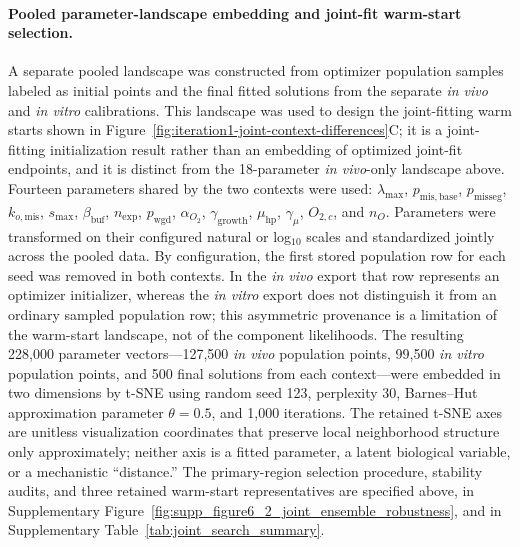 \documentclass[11pt]{article}
\begin{document}
\paragraph{Pooled parameter-landscape embedding and joint-fit warm-start selection.}
A separate pooled landscape was constructed from optimizer population samples labeled as initial points and the final fitted solutions from the separate \textit{in vivo} and \textit{in vitro} calibrations. This landscape was used to design the joint-fitting warm starts shown in Figure~\ref{fig:iteration1-joint-context-differences}C; it is a joint-fitting initialization result rather than an embedding of optimized joint-fit endpoints, and it is distinct from the 18-parameter \textit{in vivo}-only landscape above. Fourteen parameters shared by the two contexts were used: $\lambda_{\max}$, $p_{\mathrm{mis,base}}$, $p_{\mathrm{misseg}}$, $k_{o,\mathrm{mis}}$, $s_{\max}$, $\beta_{\mathrm{buf}}$, $n_{\mathrm{exp}}$, $p_{\mathrm{wgd}}$, $\alpha_{O_2}$, $\gamma_{\mathrm{growth}}$, $\mu_{\mathrm{hp}}$, $\gamma_\mu$, $O_{2,c}$, and $n_O$. Parameters were transformed on their configured natural or log$_{10}$ scales and standardized jointly across the pooled data. By configuration, the first stored population row for each seed was removed in both contexts. In the \textit{in vivo} export that row represents an optimizer initializer, whereas the \textit{in vitro} export does not distinguish it from an ordinary sampled population row; this asymmetric provenance is a limitation of the warm-start landscape, not of the component likelihoods. The resulting 228,000 parameter vectors---127,500 \textit{in vivo} population points, 99,500 \textit{in vitro} population points, and 500 final solutions from each context---were embedded in two dimensions by t-SNE \cite{maaten_visualizing_2008} using random seed 123, perplexity 30, Barnes--Hut approximation parameter $\theta=0.5$, and 1,000 iterations. The retained t-SNE axes are unitless visualization coordinates that preserve local neighborhood structure only approximately; neither axis is a fitted parameter, a latent biological variable, or a mechanistic ``distance.'' The primary-region selection procedure, stability audits, and three retained warm-start representatives are specified above, in Supplementary Figure~\ref{fig:supp_figure6_2_joint_ensemble_robustness}, and in Supplementary Table~\ref{tab:joint_search_summary}.
\end{document}
